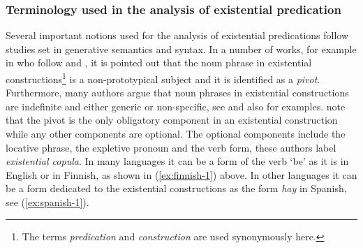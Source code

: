 \documentclass[output=paper,chinesefont,colorlinks,citecolor=brown]{langscibook}
\begin{document}
\subsubsection{Terminology used in the analysis of existential predication}\label{sect:terminology}\label{sec:intro:2.2.2}
Several important notions used for the analysis of existential predications follow studies set in generative semantics and syntax. In a number of works, for example in  \citet[1]{BentleyCiconte2013} who follow \citet{Francez2011,McNally2011} and \citet{Francez2007}, it is pointed out that the noun phrase in existential constructions\footnote{The terms \textit{predication} and \textit{construction} are used synonymously here.} is a non-prototypical subject and it is identified as a \textit{pivot}. Furthermore, many authors argue that noun phrases in existential constructions are indefinite and either generic or non-specific, see \citet[219]{McNally2016} and also \citet[538]{Koch2012} for examples. \citet[1--2]{BentleyCiconte2013} note that the pivot is the only obligatory component in an existential construction while any other components are optional. The optional components include the locative phrase, the expletive pronoun and the verb form, these authors label \textit{existential copula}. In many languages it can be a form of the verb ‘be’ as it is in English or in Finnish, as shown in (\ref{ex:finnish-1}) above. In other languages it can be a form dedicated to the existential constructions as the form \textit{hay} in Spanish, see (\ref{ex:spanish-1}).
\end{document}
